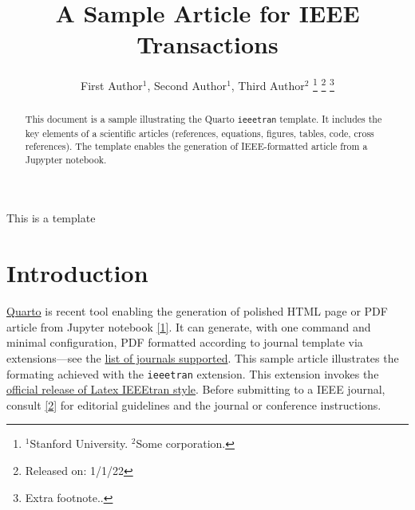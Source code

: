 \documentclass[letterpaper, 10 pt, journal, twoside]{IEEEtran}
\begin{document}
\author{
        First Author\(^1\),     Second
Author\(^1\),     Third Author\(^2\)
    \thanks{\(^1\)Stanford University. \(^2\)Some corporation.}
    \thanks{Released on: 1/1/22}
    \thanks{Extra footnote..}
}


\title{A Sample Article for IEEE Transactions}
\maketitle

\begin{abstract}
    This document is a sample illustrating the Quarto \texttt{ieeetran}
    template. It includes the key elements of a scientific articles
    (references, equations, figures, tables, code, cross references).
    The template enables the generation of IEEE-formatted article from a
    Jupypter notebook.
\end{abstract}

\begin{tcolorbox}[enhanced jigsaw, opacityback=0, leftrule=.75mm, titlerule=0mm, breakable, coltitle=black, left=2mm, colback=white, colframe=quarto-callout-note-color-frame, toptitle=1mm, arc=.35mm, bottomrule=.15mm, toprule=.15mm, bottomtitle=1mm, title=\textcolor{quarto-callout-note-color}{\faInfo}\hspace{0.5em}{Note}, rightrule=.15mm, colbacktitle=quarto-callout-note-color!10!white, opacitybacktitle=0.6]

This is a template

\end{tcolorbox}

\hypertarget{sec-intro}{%
\section{Introduction}\label{sec-intro}}

\href{https://quarto.org/}{Quarto} is recent tool enabling the
generation of polished HTML page or PDF article from Jupyter notebook
\protect\hyperlink{ref-Close2022-dt}{{[}1{]}}. It can generate, with one
command and minimal configuration, PDF formatted according to journal
template via extensions---see the
\href{https://github.com/quarto-journals/}{list of journals supported}.
This sample article illustrates the formating achieved with the
\texttt{ieeetran} extension. This extension invokes the
\href{https://www.ctan.org/tex-archive/macros/latex/contrib/IEEEtran/}{official
release of Latex IEEEtran style}. Before submitting to a IEEE journal,
consult \protect\hyperlink{ref-Ieee2020-zv}{{[}2{]}} for editorial
guidelines and the journal or conference instructions.
\end{document}
